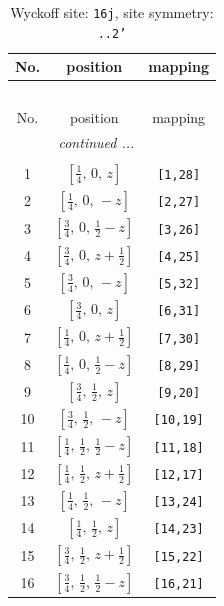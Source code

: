 \documentclass[fleqn,8pt]{jsarticle}
\begin{document}
\begin{longtable}{ccc}
\caption{Wyckoff site: {\tt 16j}, site symmetry: {\tt ..2'}}
 \\
 \hline \hline
No. & position & mapping \\ \hline \endfirsthead

\multicolumn{2}{l}{\tablename\ \thetable{}} \\
 \hline \hline
No. & position & mapping \\ \hline \endhead

 \hline \hline
\multicolumn{2}{r}{\footnotesize\it continued ...} \\ \endfoot

 \hline \hline
\multicolumn{2}{r}{} \\ \endlastfoot

1 & $\left[ \frac{1}{4},\, 0,\, z \right]$ & {\tt [1,28]} \\ \hline
2 & $\left[ \frac{1}{4},\, 0,\, - z \right]$ & {\tt [2,27]} \\ \hline
3 & $\left[ \frac{3}{4},\, 0,\, \frac{1}{2} - z \right]$ & {\tt [3,26]} \\ \hline
4 & $\left[ \frac{3}{4},\, 0,\, z + \frac{1}{2} \right]$ & {\tt [4,25]} \\ \hline
5 & $\left[ \frac{3}{4},\, 0,\, - z \right]$ & {\tt [5,32]} \\ \hline
6 & $\left[ \frac{3}{4},\, 0,\, z \right]$ & {\tt [6,31]} \\ \hline
7 & $\left[ \frac{1}{4},\, 0,\, z + \frac{1}{2} \right]$ & {\tt [7,30]} \\ \hline
8 & $\left[ \frac{1}{4},\, 0,\, \frac{1}{2} - z \right]$ & {\tt [8,29]} \\ \hline
9 & $\left[ \frac{3}{4},\, \frac{1}{2},\, z \right]$ & {\tt [9,20]} \\ \hline
10 & $\left[ \frac{3}{4},\, \frac{1}{2},\, - z \right]$ & {\tt [10,19]} \\ \hline
11 & $\left[ \frac{1}{4},\, \frac{1}{2},\, \frac{1}{2} - z \right]$ & {\tt [11,18]} \\ \hline
12 & $\left[ \frac{1}{4},\, \frac{1}{2},\, z + \frac{1}{2} \right]$ & {\tt [12,17]} \\ \hline
13 & $\left[ \frac{1}{4},\, \frac{1}{2},\, - z \right]$ & {\tt [13,24]} \\ \hline
14 & $\left[ \frac{1}{4},\, \frac{1}{2},\, z \right]$ & {\tt [14,23]} \\ \hline
15 & $\left[ \frac{3}{4},\, \frac{1}{2},\, z + \frac{1}{2} \right]$ & {\tt [15,22]} \\ \hline
16 & $\left[ \frac{3}{4},\, \frac{1}{2},\, \frac{1}{2} - z \right]$ & {\tt [16,21]} \\
\end{longtable}
\end{document}
